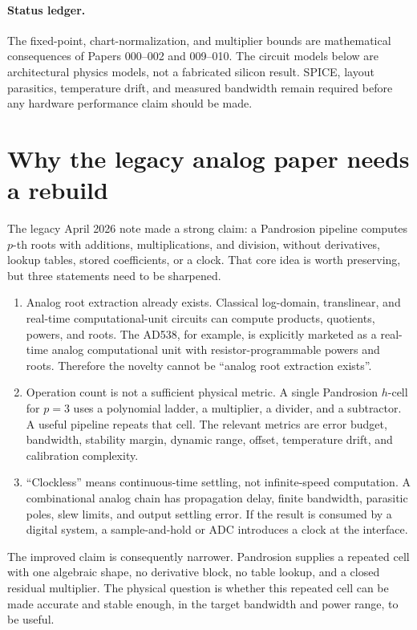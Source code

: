 \documentclass[11pt]{article}
\begin{document}
\paragraph{Status ledger.}
The fixed-point, chart-normalization, and multiplier bounds are mathematical
consequences of Papers 000--002 and 009--010.  The circuit models below are
architectural physics models, not a fabricated silicon result.  SPICE,
layout parasitics, temperature drift, and measured bandwidth remain required
before any hardware performance claim should be made.

\tableofcontents

\section{Why the legacy analog paper needs a rebuild}

The legacy April 2026 note made a strong claim: a Pandrosion pipeline computes
\(p\)-th roots with additions, multiplications, and division, without
derivatives, lookup tables, stored coefficients, or a clock.  That core idea is
worth preserving, but three statements need to be sharpened.

\begin{enumerate}[leftmargin=2em]
\item Analog root extraction already exists.  Classical log-domain,
translinear, and real-time computational-unit circuits can compute products,
quotients, powers, and roots.  The AD538, for example, is explicitly marketed
as a real-time analog computational unit with resistor-programmable powers and
roots.  Therefore the novelty cannot be ``analog root extraction exists''.
\item Operation count is not a sufficient physical metric.  A single
Pandrosion \(h\)-cell for \(p=3\) uses a polynomial ladder, a multiplier, a
divider, and a subtractor.  A useful pipeline repeats that cell.  The relevant
metrics are error budget, bandwidth, stability margin, dynamic range, offset,
temperature drift, and calibration complexity.
\item ``Clockless'' means continuous-time settling, not infinite-speed
computation.  A combinational analog chain has propagation delay, finite
bandwidth, parasitic poles, slew limits, and output settling error.  If the
result is consumed by a digital system, a sample-and-hold or ADC introduces a
clock at the interface.
\end{enumerate}

The improved claim is consequently narrower.  Pandrosion supplies a repeated
cell with one algebraic shape, no derivative block, no table lookup, and a
closed residual multiplier.  The physical question is whether this repeated
cell can be made accurate and stable enough, in the target bandwidth and power
range, to be useful.
\end{document}
